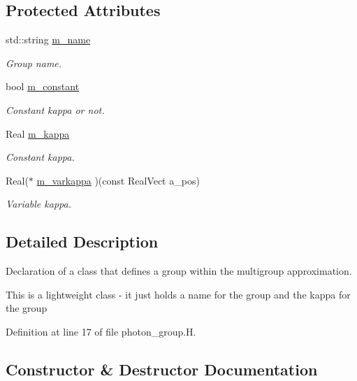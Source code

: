 \subsection*{Protected Attributes}
\begin{DoxyCompactItemize}
\item 
std\+::string \hyperlink{classphoton__group_ad86e5d4576634fbba61331f252a5d9d9}{m\+\_\+name}
\begin{DoxyCompactList}\small\item\em Group name. \end{DoxyCompactList}\item 
bool \hyperlink{classphoton__group_a671607459a709e082f5913d6ace92384}{m\+\_\+constant}
\begin{DoxyCompactList}\small\item\em Constant kappa or not. \end{DoxyCompactList}\item 
Real \hyperlink{classphoton__group_a9f2d99f8fc5625d176ef5e85c54faac2}{m\+\_\+kappa}
\begin{DoxyCompactList}\small\item\em Constant kappa. \end{DoxyCompactList}\item 
Real($\ast$ \hyperlink{classphoton__group_a053d549d0eb6000b0e6ee45e6215ebcf}{m\+\_\+varkappa} )(const Real\+Vect a\+\_\+pos)
\begin{DoxyCompactList}\small\item\em Variable kappa. \end{DoxyCompactList}\end{DoxyCompactItemize}


\subsection{Detailed Description}
Declaration of a class that defines a group within the multigroup approximation. 

This is a lightweight class -\/ it just holds a name for the group and the kappa for the group 

Definition at line 17 of file photon\+\_\+group.\+H.



\subsection{Constructor \& Destructor Documentation}
